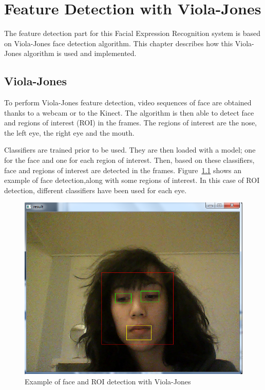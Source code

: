 \chapter{Feature Detection with Viola-Jones}
\label{chap:implementation_violajones}

\noindent The feature detection part for this Facial Expression Recognition system is based on Viola-Jones face detection algorithm. This chapter describes how this Viola-Jones algorithm is used and implemented.
\newline

\section{Viola-Jones}

\vspace{\baselineskip}
\noindent To perform Viola-Jones feature detection, video sequences of face are obtained thanks to a webcam or to the Kinect. The algorithm is then able to detect face and regions of interest (ROI) in the frames. The regions of interest are the nose, the left eye, the right eye and the mouth. 
\newline

\noindent Classifiers are trained prior to be used. They are then loaded with a model; one for the face and one for each region of interest. Then, based on these classifiers, face and regions of interest are detected in the frames. Figure~\ref{violajones_implementation_example} shows an example of face detection,along with some regions of interest. In this case of ROI detection, different classifiers have been used for each eye. 
\newline

\begin{figure}[!h]
\begin{center}
\noindent \includegraphics[scale=0.4]{figures/violajones_implementation_example} 
\newline
\caption{Example of face and ROI detection with Viola-Jones}
\label{violajones_implementation_example}
\end{center} 
\end{figure}